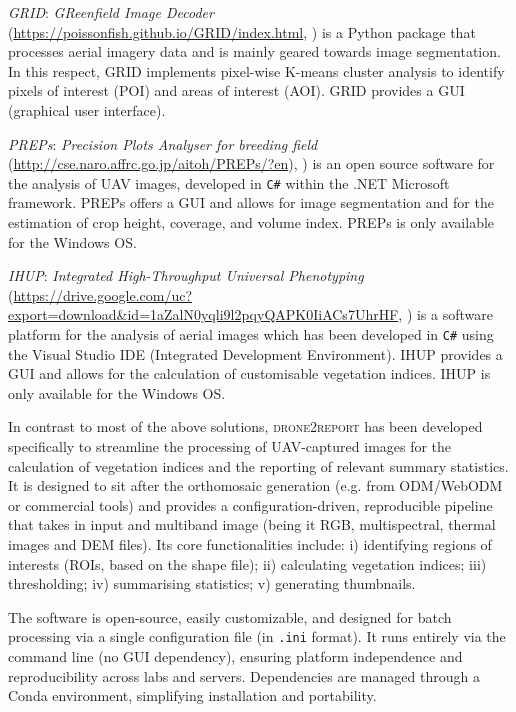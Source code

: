 \documentclass[drones,technicalnote,accept,pdftex,moreauthors]{Definitions/mdpi}
\begin{document}
\textit{GRID}: \textit{GReenfield Image Decoder} (\url{https://poissonfish.github.io/GRID/index.html},
\cite{ChenZhang2020}) is a Python package that processes aerial imagery data and is mainly geared towards image segmentation. In this respect, GRID implements pixel-wise K-means cluster analysis to identify pixels of interest (POI) and areas of interest (AOI). GRID provides a GUI (graphical user interface).

\textit{PREPs}: \textit{Precision Plots Analyser for breeding field} (\url{http://cse.naro.affrc.go.jp/aitoh/PREPs/?en}), \cite{itoh2024preps}) is an open source software for the analysis of UAV images, developed in \verb|C#| within the .NET Microsoft framework. PREPs offers a GUI and allows for image segmentation and for the estimation of crop height, coverage, and volume index. PREPs is only available for the Windows OS.

\textit{IHUP}: \textit{Integrated High-Throughput Universal Phenotyping} (\url{https://drive.google.com/uc?export=download&id=1aZalN0yqli9l2pqyQAPK0IiACs7UhrHF}, \cite{wang2024ihup}) is a software platform for the analysis of aerial images which has been developed in \verb|C#| using the Visual Studio IDE (Integrated Development Environment). IHUP provides a GUI and allows for the calculation of customisable vegetation indices. IHUP is only available for the Windows OS.

\bigskip

In contrast to most of the above solutions, \textsc{drone2report} has been developed specifically to streamline the processing of UAV-captured images for the calculation of vegetation indices and the reporting of relevant summary statistics.
It is designed to sit after the orthomosaic generation (e.g. from ODM/WebODM or commercial tools) and provides a configuration-driven, reproducible pipeline that takes in input and multiband image (being it RGB, multispectral, thermal images and DEM files).  Its core functionalities include: i) identifying regions of interests (ROIs, based on the shape file); ii) calculating vegetation indices; iii) thresholding; iv) summarising statistics; v) generating thumbnails.

The software is open-source, easily customizable, and designed for batch processing via a single configuration file (in \texttt{.ini} format). It runs entirely via the command line (no GUI dependency), ensuring platform independence and reproducibility across labs and servers. Dependencies are managed through a Conda environment, simplifying installation and portability.
\end{document}
